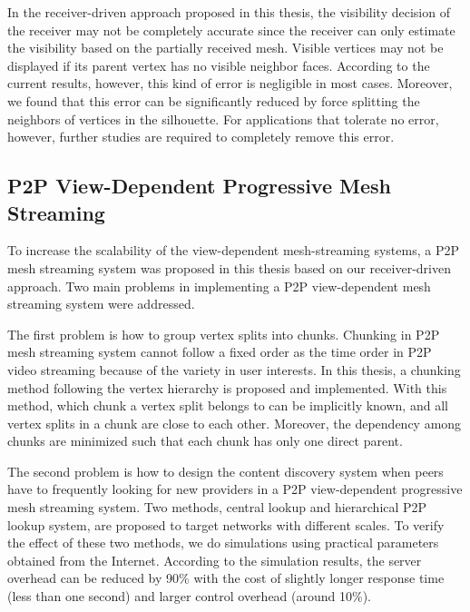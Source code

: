 In the receiver-driven approach proposed in this thesis, 
the visibility decision of the receiver may not be completely accurate 
since the receiver can only estimate the visibility based on
the partially received mesh. 
Visible vertices may not be displayed if its parent vertex has no visible neighbor faces.
According to the current results, however, this kind of error is negligible in most cases. 
Moreover, we found that this error can be significantly reduced by force splitting
the neighbors of vertices in the silhouette.
For applications that tolerate no error, however, 
further studies are required to completely remove this error. 

\subsection{P2P View-Dependent Progressive Mesh Streaming}
To increase the scalability of the view-dependent mesh-streaming systems, 
a P2P mesh streaming system was proposed in this thesis based on our receiver-driven approach.
Two main problems in implementing a P2P view-dependent mesh streaming system were addressed.

The first problem is how to group vertex splits into chunks. Chunking in P2P mesh streaming system
cannot follow a fixed order as the time order in P2P video streaming because of the variety in user 
interests. In this thesis, a chunking method following the vertex hierarchy is proposed and implemented. 
With this method, which chunk a vertex split belongs to can be 
implicitly known, and all vertex splits in a chunk are close to each other. 
Moreover, the dependency among chunks are minimized such that each chunk has only one direct parent. 

The second problem is how to design the content discovery system when
peers have to frequently looking for new providers in a P2P view-dependent progressive 
mesh streaming system. 
Two methods, central lookup and hierarchical P2P lookup system, are proposed
to target networks with different scales. 
To verify the effect of these two methods, 
we do simulations using
practical parameters obtained from the Internet. 
According to the simulation results, 
the server overhead can be reduced by 90\%
with the cost of slightly longer response time (less than one second)
and larger control overhead (around 10\%).

